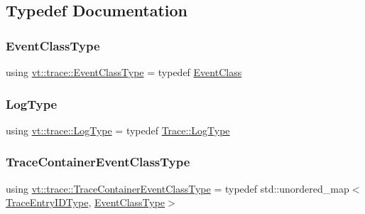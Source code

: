 \subsection{Typedef Documentation}
\mbox{\label{namespacevt_1_1trace_afc5456ac95b0d3e9bb63a21597f5660c}} 
\subsubsection{\texorpdfstring{Event\+Class\+Type}{EventClassType}}
{\footnotesize\ttfamily using \hyperlink{namespacevt_1_1trace_afc5456ac95b0d3e9bb63a21597f5660c}{vt\+::trace\+::\+Event\+Class\+Type} = typedef \hyperlink{structvt_1_1trace_1_1_event_class}{Event\+Class}}

\mbox{\label{namespacevt_1_1trace_abf816ddd3c20f0f8d974662f373b088d}} 
\subsubsection{\texorpdfstring{Log\+Type}{LogType}}
{\footnotesize\ttfamily using \hyperlink{namespacevt_1_1trace_abf816ddd3c20f0f8d974662f373b088d}{vt\+::trace\+::\+Log\+Type} = typedef \hyperlink{structvt_1_1trace_1_1_trace_a43306d96a91e49db081eaea016f1dd0a}{Trace\+::\+Log\+Type}}

\mbox{\label{namespacevt_1_1trace_a352c8799ee88afa3f1b7008952ed8485}} 
\subsubsection{\texorpdfstring{Trace\+Container\+Event\+Class\+Type}{TraceContainerEventClassType}}
{\footnotesize\ttfamily using \hyperlink{namespacevt_1_1trace_a352c8799ee88afa3f1b7008952ed8485}{vt\+::trace\+::\+Trace\+Container\+Event\+Class\+Type} = typedef std\+::unordered\+\_\+map$<$\hyperlink{namespacevt_1_1trace_a3c14050715ba9eceaeff51fb3de64f2f}{Trace\+Entry\+I\+D\+Type}, \hyperlink{namespacevt_1_1trace_afc5456ac95b0d3e9bb63a21597f5660c}{Event\+Class\+Type}$>$}

